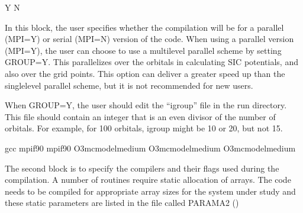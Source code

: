 \documentclass[letterpaper,10pt,english,openany,oneside]{sphinxmanual}
\begin{document}
\sphinxAtStartPar
{}

\begin{sphinxVerbatim}[commandchars=\\\{\}]
Y
N
\end{sphinxVerbatim}

\sphinxAtStartPar
In this block, the user specifies whether the compilation will be for a parallel (MPI=Y) or serial (MPI=N) version of the code.
When using a parallel version (MPI=Y), the user can choose to use a multi\sphinxhyphen{}level parallel scheme by setting GROUP=Y.
This parallelizes over the orbitals in calculating SIC potentials, and also over the grid points.
This option can deliver a greater speed up than the single\sphinxhyphen{}level parallel scheme, but it is not recommended for new users.

\sphinxAtStartPar
When GROUP=Y, the user should edit the “igroup” file in the run directory.  This file should contain an integer that is
an even divisor of the number of orbitals. For example, for 100 orbitals, igroup might be 10 or 20, but not 15.

\sphinxAtStartPar
{}

\begin{sphinxVerbatim}[commandchars=\\\{\}]
gcc
mpif90
mpif90
\PYGZhy{}O3\PYGZhy{}mcmodelmedium
\PYGZhy{}O3\PYGZhy{}mcmodelmedium
\PYGZhy{}O3\PYGZhy{}mcmodelmedium
\end{sphinxVerbatim}

\sphinxAtStartPar
The second block is to specify the compilers and their flags used during the compilation. A number of routines require static allocation of arrays. The code needs to be compiled for appropriate array sizes for the system under study and these static parameters are listed in the file called PARAMA2 ()
\end{document}
